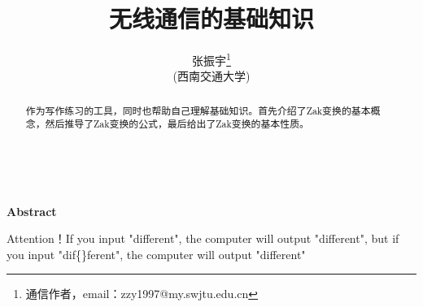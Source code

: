 \documentclass[12pt,a4paper]{article}%
\title{\fontsize{18pt}{27pt}\selectfont%
	{\heiti%
		无线通信的基础知识}}%
\author{\fontsize{12pt}{18pt}\selectfont%
	{\fangsong%
		张振宇}\thanks{通信作者，email：zzy1997@my.swjtu.edu.cn}\\%
	\fontsize{10.5pt}{15.75pt}\selectfont%
	{\fangsong%
		(西南交通大学)}}%
\date{}%
\begin{document}
	\maketitle%
	\lhead{}%
	\chead{}%
	\rhead{}%
	\lfoot{}%
	\cfoot{\thepage}%
	\rfoot{}%
	\begin{abstract}
		\fangsong 作为写作练习的工具，同时也帮助自己理解基础知识。首先介绍了Zak变换的基本概念，然后推导了Zak变换的公式，最后给出了Zak变换的基本性质。\\
	\end{abstract}
	
	\begin{adjustwidth}{1.06cm}{1.06cm}
		\fontsize{10.5pt}{15.75pt}\\
	\end{adjustwidth}
	
	\begin{center}%
		{\textbf{Abstract}}%
	\end{center}
	\begin{adjustwidth}{1.06cm}{1.06cm}%
		\hspace{1.5em}Attention！If you input "dif{}ferent", the computer will output "different", but if you input "dif\{\}ferent", the computer will output "dif{}ferent"
	\end{adjustwidth}
	\newpage%
\end{document}
